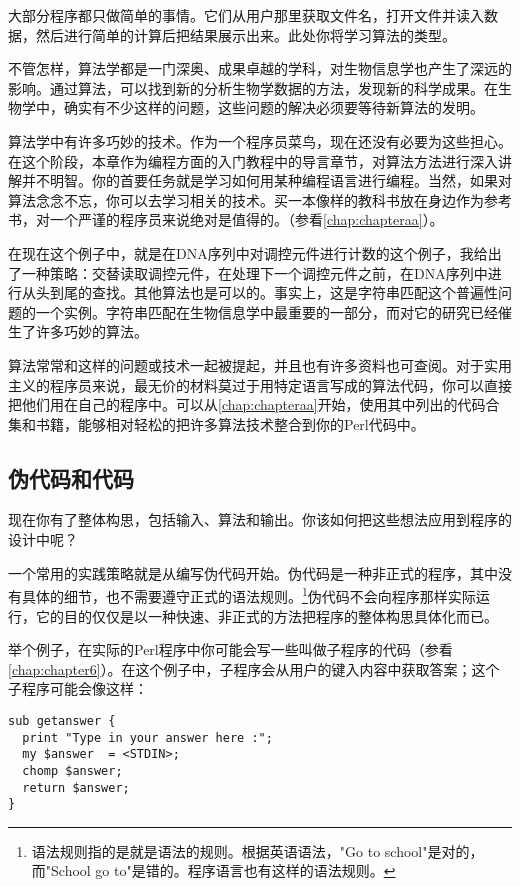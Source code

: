 大部分程序都只做简单的事情。它们从用户那里获取文件名，打开文件并读入数据，然后进行简单的计算后把结果展示出来。此处你将学习算法的类型。

不管怎样，算法学都是一门深奥、成果卓越的学科，对生物信息学也产生了深远的影响。通过算法，可以找到新的分析生物学数据的方法，发现新的科学成果。在生物学中，确实有不少这样的问题，这些问题的解决必须要等待新算法的发明。

算法学中有许多巧妙的技术。作为一个程序员菜鸟，现在还没有必要为这些担心。在这个阶段，本章作为编程方面的入门教程中的导言章节，对算法方法进行深入讲解并不明智。你的首要任务就是学习如何用某种编程语言进行编程。当然，如果对算法念念不忘，你可以去学习相关的技术。买一本像样的教科书放在身边作为参考书，对一个严谨的程序员来说绝对是值得的。（参看\ref{chap:chapteraa}）。

在现在这个例子中，就是在DNA序列中对调控元件进行计数的这个例子，我给出了一种策略：交替读取调控元件，在处理下一个调控元件之前，在DNA序列中进行从头到尾的查找。其他算法也是可以的。事实上，这是字符串匹配这个普遍性问题的一个实例。字符串匹配在生物信息学中最重要的一部分，而对它的研究已经催生了许多巧妙的算法。

算法常常和这样的问题或技术一起被提起，并且也有许多资料也可查阅。对于实用主义的程序员来说，最无价的材料莫过于用特定语言写成的算法代码，你可以直接把他们用在自己的程序中。可以从\ref{chap:chapteraa}开始，使用其中列出的代码合集和书籍，能够相对轻松的把许多算法技术整合到你的Perl代码中。

\subsection{伪代码和代码}
现在你有了整体构思，包括输入、算法和输出。你该如何把这些想法应用到程序的设计中呢？

一个常用的实践策略就是从编写伪代码开始。伪代码是一种非正式的程序，其中没有具体的细节，也不需要遵守正式的语法规则。\footnote{语法规则指的是就是语法的规则。根据英语语法，"Go to school"是对的，而"School go to"是错的。程序语言也有这样的语法规则。}伪代码不会向程序那样实际运行，它的目的仅仅是以一种快速、非正式的方法把程序的整体构思具体化而已。

举个例子，在实际的Perl程序中你可能会写一些叫做子程序的代码（参看\ref{chap:chapter6}）。在这个例子中，子程序会从用户的键入内容中获取答案；这个子程序可能会像这样：

\begin{lstlisting}
sub getanswer {
  print "Type in your answer here :";
  my $answer  = <STDIN>;
  chomp $answer;
  return $answer;
}
\end{lstlisting}

